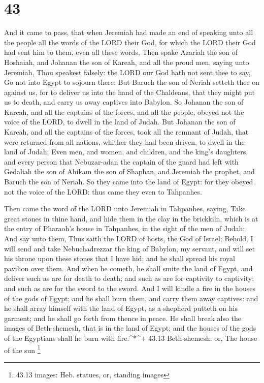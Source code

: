 \hypertarget{section-42}{%
\section{43}\label{section-42}}

 And it came to pass, that when Jeremiah had made an end of
speaking unto all the people all the words of the LORD their God, for
which the LORD their God had sent him to them, even all these words,
 Then spake Azariah the son of Hoshaiah, and Johanan the son
of Kareah, and all the proud men, saying unto Jeremiah, Thou speakest
falsely: the LORD our God hath not sent thee to say, Go not into Egypt
to sojourn there:  But Baruch the son of Neriah setteth thee
on against us, for to deliver us into the hand of the Chaldeans, that
they might put us to death, and carry us away captives into Babylon.
 So Johanan the son of Kareah, and all the captains of the
forces, and all the people, obeyed not the voice of the LORD, to dwell
in the land of Judah.  But Johanan the son of Kareah, and
all the captains of the forces, took all the remnant of Judah, that were
returned from all nations, whither they had been driven, to dwell in the
land of Judah;  Even men, and women, and children, and the
king's daughters, and every person that Nebuzar-adan the captain of the
guard had left with Gedaliah the son of Ahikam the son of Shaphan, and
Jeremiah the prophet, and Baruch the son of Neriah.  So they
came into the land of Egypt: for they obeyed not the voice of the LORD:
thus came they even to Tahpanhes.

 Then came the word of the LORD unto Jeremiah in Tahpanhes,
saying,  Take great stones in thine hand, and hide them in
the clay in the brickkiln, which is at the entry of Pharaoh's house in
Tahpanhes, in the sight of the men of Judah;  And say unto
them, Thus saith the LORD of hosts, the God of Israel; Behold, I will
send and take Nebuchadrezzar the king of Babylon, my servant, and will
set his throne upon these stones that I have hid; and he shall spread
his royal pavilion over them.  And when he cometh, he shall
smite the land of Egypt, and deliver such as are for death to death; and
such as are for captivity to captivity; and such as are for the sword to
the sword.  And I will kindle a fire in the houses of the
gods of Egypt; and he shall burn them, and carry them away captives: and
he shall array himself with the land of Egypt, as a shepherd putteth on
his garment; and he shall go forth from thence in peace. 
He shall break also the images of Beth-shemesh, that is in the land of
Egypt; and the houses of the gods of the Egyptians shall he burn with
fire.\^{}*\^{}+ 43.13 Beth-shemesh: or, The house of the sun \footnote{43.13
  images: Heb. statues, or, standing images}


